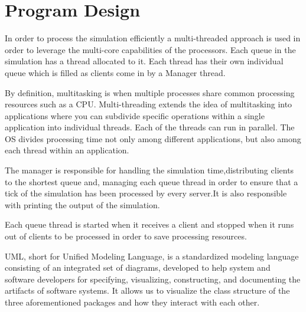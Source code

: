 \documentclass[10pt,a4paper]{article}
\begin{document}
\section{Program Design}
In order to process the simulation efficiently a multi-threaded approach is used in order to leverage the multi-core capabilities of the processors. Each queue in the simulation has a thread allocated to it. Each thread has their own individual queue which is filled as clients come in by a Manager thread.\par
By definition, multitasking is when multiple processes share common processing resources such as a CPU. Multi-threading extends the idea of multitasking into applications where you can subdivide specific operations within a single application into individual threads. Each of the threads can run in parallel. The OS divides processing time not only among different applications, but also among each thread within an application.\par
The manager is responsible for handling the simulation time,distributing clients to the shortest queue and, managing each queue thread in order to ensure that a tick of the simulation has been processed by every server.It is also responsible with printing the output of the simulation.\par
Each queue thread is started when it receives a client and stopped when it runs out of clients to be processed in order to save processing resources.

UML, short for Unified Modeling Language, is a standardized modeling language consisting of an integrated set of diagrams, developed to help system and software developers for specifying, visualizing, constructing, and documenting the artifacts of software systems. It allows us to visualize the class structure of the three aforementioned packages and how they interact with each other.
\end{document}
